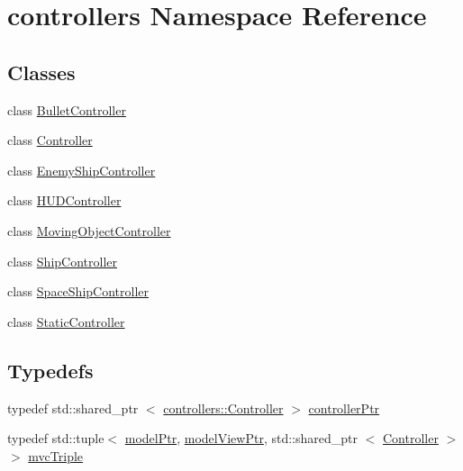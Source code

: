 \hypertarget{namespacecontrollers}{\section{controllers \-Namespace \-Reference}
\label{de/d2c/namespacecontrollers}
}
\subsection*{\-Classes}
\begin{DoxyCompactItemize}
\item 
class \hyperlink{classcontrollers_1_1BulletController}{\-Bullet\-Controller}
\item 
class \hyperlink{classcontrollers_1_1Controller}{\-Controller}
\item 
class \hyperlink{classcontrollers_1_1EnemyShipController}{\-Enemy\-Ship\-Controller}
\item 
class \hyperlink{classcontrollers_1_1HUDController}{\-H\-U\-D\-Controller}
\item 
class \hyperlink{classcontrollers_1_1MovingObjectController}{\-Moving\-Object\-Controller}
\item 
class \hyperlink{classcontrollers_1_1ShipController}{\-Ship\-Controller}
\item 
class \hyperlink{classcontrollers_1_1SpaceShipController}{\-Space\-Ship\-Controller}
\item 
class \hyperlink{classcontrollers_1_1StaticController}{\-Static\-Controller}
\end{DoxyCompactItemize}
\subsection*{\-Typedefs}
\begin{DoxyCompactItemize}
\item 
typedef std\-::shared\-\_\-ptr\*
$<$ \hyperlink{classcontrollers_1_1Controller}{controllers\-::\-Controller} $>$ \hyperlink{namespacecontrollers_ab74cf2ed38c0b0460698b4eb6fe8bec5}{controller\-Ptr}
\item 
typedef std\-::tuple$<$ \hyperlink{ModelView_8h_a78966ddb517fca8d2b29a2bc5c31e74e}{model\-Ptr}, \*
\hyperlink{Controller_8h_a8ca0a41a38eb52be242997413482c0cf}{model\-View\-Ptr}, std\-::shared\-\_\-ptr\*
$<$ \hyperlink{classcontrollers_1_1Controller}{\-Controller} $>$ $>$ \hyperlink{namespacecontrollers_afa9121480272f6c66b98dfad7aa403d3}{mvc\-Triple}
\end{DoxyCompactItemize}

